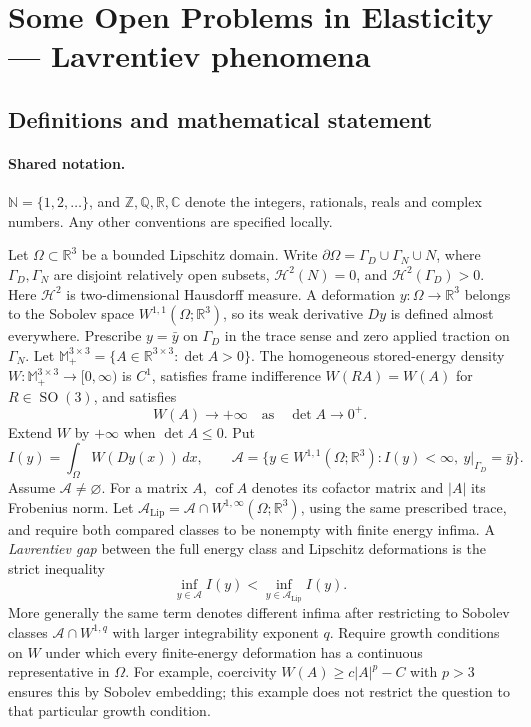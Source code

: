 \documentclass[11pt]{book}
\begin{document}
\section{Some Open Problems in Elasticity — Lavrentiev phenomena}\label{statement}

\subsection{Definitions and mathematical statement}

\paragraph{Shared notation.}$\mathbb N=\{1,2,\ldots\}$, and $\mathbb Z,\mathbb Q,\mathbb R,\mathbb C$ denote the integers, rationals, reals and complex numbers. Any other conventions are specified locally.


Let $\Omega\subset\mathbb R^3$ be a bounded Lipschitz domain. Write $\partial\Omega=\Gamma_D\cup\Gamma_N\cup N$, where $\Gamma_D,\Gamma_N$ are disjoint relatively open subsets, $\mathcal H^2(N)=0$, and $\mathcal H^2(\Gamma_D)>0$. Here $\mathcal H^2$ is two-dimensional Hausdorff measure. A deformation $y:\Omega\to\mathbb R^3$ belongs to the Sobolev space $W^{1,1}(\Omega;\mathbb R^3)$, so its weak derivative $Dy$ is defined almost everywhere. Prescribe $y=\bar y$ on $\Gamma_D$ in the trace sense and zero applied traction on $\Gamma_N$.
Let $\mathbb M_+^{3\times3}=\{A\in\mathbb R^{3\times3}:\det A>0\}$. The homogeneous stored-energy density $W:\mathbb M_+^{3\times3}\to[0,\infty)$ is $C^1$, satisfies frame indifference $W(RA)=W(A)$ for $R\in\operatorname{SO}(3)$, and satisfies
\[
 W(A)\longrightarrow+\infty\quad\text{as}\quad\det A\longrightarrow0^+.
\]
Extend $W$ by $+\infty$ when $\det A\le0$. Put
\[
 I(y)=\int_\Omega W(Dy(x))\,dx,\qquad
 \mathcal A=\{y\in W^{1,1}(\Omega;\mathbb R^3):I(y)<\infty,\ y|_{\Gamma_D}=\bar y\}.
\]
Assume $\mathcal A\ne\varnothing$. For a matrix $A$, $\operatorname{cof}A$ denotes its cofactor matrix and $|A|$ its Frobenius norm.
Let $\mathcal A_{\mathrm{Lip}}=\mathcal A\cap W^{1,\infty}(\Omega;\mathbb R^3)$, using the same prescribed trace, and require both compared classes to be nonempty with finite energy infima. A \emph{Lavrentiev gap} between the full energy class and Lipschitz deformations is the strict inequality
\[
 \inf_{y\in\mathcal A} I(y)<\inf_{y\in\mathcal A_{\mathrm{Lip}}} I(y).
\]
More generally the same term denotes different infima after restricting to Sobolev classes $\mathcal A\cap W^{1,q}$ with larger integrability exponent $q$. Require growth conditions on $W$ under which every finite-energy deformation has a continuous representative in $\Omega$. For example, coercivity $W(A)\ge c|A|^p-C$ with $p>3$ ensures this by Sobolev embedding; this example does not restrict the question to that particular growth condition.
\end{document}
